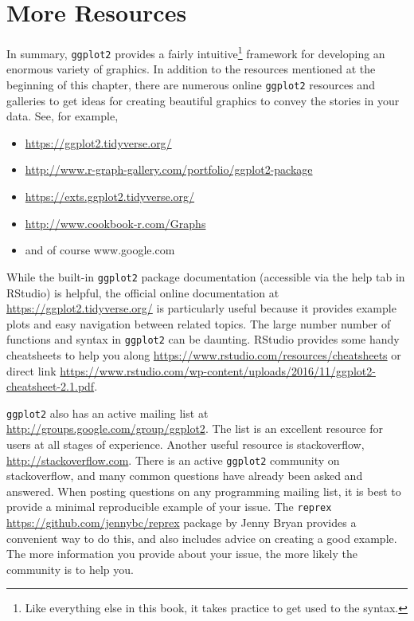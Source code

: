 \documentclass[
]{krantz}
\providecommand{\tightlist}{%
  \setlength{\itemsep}{0pt}\setlength{\parskip}{0pt}}
\begin{document}
\hypertarget{more-resources}{%
\section{More Resources}\label{more-resources}}

In summary, \texttt{ggplot2} provides a fairly intuitive\footnote{Like everything else in this book, it takes practice to get used to the syntax.} framework for developing an enormous variety of graphics. In addition to the resources mentioned at the beginning of this chapter, there are numerous online \texttt{ggplot2} resources and galleries to get ideas for creating beautiful graphics to convey the stories in your data. See, for example,

\begin{itemize}
\tightlist
\item
  \url{https://ggplot2.tidyverse.org/}
\item
  \url{http://www.r-graph-gallery.com/portfolio/ggplot2-package}
\item
  \url{https://exts.ggplot2.tidyverse.org/}
\item
  \url{http://www.cookbook-r.com/Graphs}
\item
  and of course www.google.com
\end{itemize}

While the built-in \texttt{ggplot2} package documentation (accessible via the help tab in RStudio) is helpful, the official online documentation at \url{https://ggplot2.tidyverse.org/} is particularly useful because it provides example plots and easy navigation between related topics. The large number number of functions and syntax in \texttt{ggplot2} can be daunting. RStudio provides some handy cheatsheets to help you along \url{https://www.rstudio.com/resources/cheatsheets} or direct link \url{https://www.rstudio.com/wp-content/uploads/2016/11/ggplot2-cheatsheet-2.1.pdf}.

\texttt{ggplot2} also has an active mailing list at \url{http://groups.google.com/group/ggplot2}. The list is an excellent resource for users at all stages of experience. Another useful resource is stackoverflow, \url{http://stackoverflow.com}. There is an active \texttt{ggplot2} community on stackoverflow, and many common questions have already been asked and answered. When posting questions on any programming mailing list, it is best to provide a minimal reproducible example of your issue. The \texttt{reprex} \url{https://github.com/jennybc/reprex} package by Jenny Bryan provides a convenient way to do this, and also includes advice on creating a good example. The more information you provide about your issue, the more likely the community is to help you.
\end{document}
